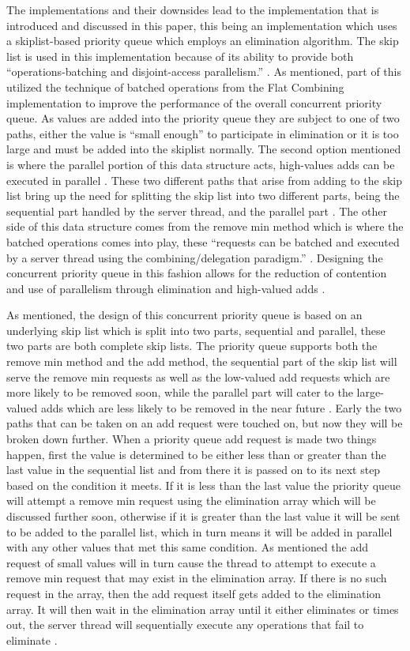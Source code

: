 \documentclass[10pt]{asme2ej}
\begin{document}
The implementations and their downsides lead to the implementation that is introduced and discussed in this paper, this being an implementation which uses a skiplist-based priority queue which employs an elimination algorithm. The skip list is used in this implementation because of its ability to provide both “operations-batching and disjoint-access parallelism.” \cite{latex}. As mentioned, part of this utilized the technique of batched operations from the Flat Combining implementation to improve the performance of the overall concurrent priority queue. As values are added into the priority queue they are subject to one of two paths, either the value is “small enough” to participate in elimination or it is too large and must be added into the skiplist normally. The second option mentioned is where the parallel portion of this data structure acts, high-values adds can be executed in parallel \cite{latex}. These two different paths that arise from adding to the skip list bring up the need for splitting the skip list into two different parts, being the sequential part handled by the server thread, and the parallel part \cite{latex}. The other side of this data structure comes from the remove min method which is where the batched operations comes into play, these “requests can be batched and executed by a server thread using the combining/delegation paradigm.” \cite{latex}. Designing the concurrent priority queue in this fashion allows for the reduction of contention and use of parallelism through elimination and high-valued adds \cite{latex}.
	
As mentioned, the design of this concurrent priority queue is based on an underlying skip list which is split into two parts, sequential and parallel, these two parts are both complete skip lists. The priority queue supports both the remove min method and the add method, the sequential part of the skip list will serve the remove min requests as well as the low-valued add requests which are more likely to be removed soon, while the parallel part will cater to the large-valued adds which are less likely to be removed in the near future \cite{latex}. Early the two paths that can be taken on an add request were touched on, but now they will be broken down further. When a priority queue add request is made two things happen, first the value is determined to be either less than or greater than the last value in the sequential list and from there it is passed on to its next step based on the condition it meets. If it is less than the last value the priority queue will attempt a remove min request using the elimination array which will be discussed further soon, otherwise if it is greater than the last value it will be sent to be added to the parallel list, which in turn means it will be added in parallel with any other values that met this same condition. As mentioned the add request of small values will in turn cause the thread to attempt to execute a remove min request that may exist in the elimination array. If there is no such request in the array, then the add request itself gets added to the elimination array. It will then wait in the elimination array until it either eliminates or times out, the server thread will sequentially execute any operations that fail to eliminate \cite{latex}.
\end{document}
